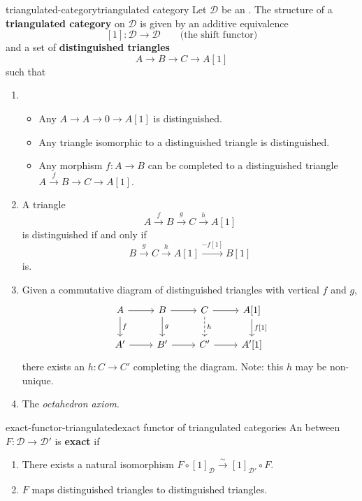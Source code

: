 \begin{topic}{triangulated-category}{triangulated category}
    Let $\mathcal{D}$ be an . The structure of a \textbf{triangulated category} on $\mathcal{D}$ is given by an additive equivalence
    \[ [1] : \mathcal{D} \to \mathcal{D} \qquad \text{(the shift functor)} \]
    and a set of \textbf{distinguished triangles}
    \[ A \to B \to C \to A[1] \]
    such that
    \begin{enumerate}
        \item \begin{itemize}
            \item Any $A \to A \to 0 \to A[1]$ is distinguished.
            \item Any triangle isomorphic to a distinguished triangle is distinguished.
            \item Any morphism $f : A \to B$ can be completed to a distinguished triangle $A \overset{f}{\to} B \to C \to A[1]$.
        \end{itemize}
        \item A triangle
        \[ A \xrightarrow{f} B \xrightarrow{g} C \xrightarrow{h} A[1] \]
        is distinguished if and only if
        \[ B \xrightarrow{g} C \xrightarrow{h} A[1] \xrightarrow{-f[1]} B[1] \]
        is.
        \item Given a commutative diagram of distinguished triangles with vertical $f$ and $g$,
        \[ \begin{tikzcd}
            A \arrow{r} \arrow{d}{f} & B \arrow{r} \arrow{d}{g} & C \arrow{r} \arrow[dashed]{d}{h} & A[1] \arrow{d}{f[1]} \\
            A' \arrow{r} & B' \arrow{r} & C' \arrow{r} & A'[1]
        \end{tikzcd} \]
        there exists an $h : C \to C'$ completing the diagram. Note: this $h$ may be non-unique.
        \item The \textit{octahedron axiom}.
    \end{enumerate}
\end{topic}

\begin{topic}{exact-functor-triangulated}{exact functor of triangulated categories}
    An  between  $F : \mathcal{D} \to \mathcal{D}'$ is \textbf{exact} if
    \begin{enumerate}
        \item There exists a natural isomorphism $F \circ [1]_\mathcal{D} \xrightarrow{\sim} [1]_{\mathcal{D}'} \circ F$.
        \item $F$ maps distinguished triangles to distinguished triangles.
    \end{enumerate}
\end{topic}

